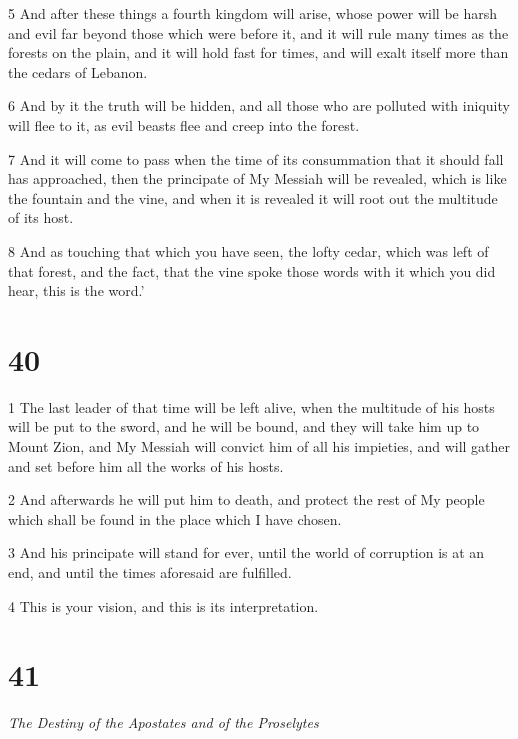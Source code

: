\par 5 And after these things a fourth kingdom will arise, whose power will be harsh and evil far beyond those which were before it, and it will rule many times as the forests on the plain, and it will hold fast for times, and will exalt itself more than the cedars of Lebanon. 

\par 6 And by it the truth will be hidden, and all those who are polluted with iniquity will flee to it, as evil beasts flee and creep into the forest. 

\par 7 And it will come to pass when the time of its consummation that it should fall has approached, then the principate of My Messiah will be revealed, which is like the fountain and the vine, and when it is revealed it will root out the multitude of its host. 

\par 8 And as touching that which you have seen, the lofty cedar, which was left of that forest, and the fact, that the vine spoke those words with it which you did hear, this is the word.’

\chapter{40}

\par 1 The last leader of that time will be left alive, when the multitude of his hosts will be put to the sword, and he will be bound, and they will take him up to Mount Zion, and My Messiah will convict him of all his impieties, and will gather and set before him all the works of his hosts. 

\par 2 And afterwards he will put him to death, and protect the rest of My people which shall be found in the place which I have chosen. 

\par 3 And his principate will stand for ever, until the world of corruption is at an end, and until the times aforesaid are fulfilled. 

\par 4 This is your vision, and this is its interpretation.


\chapter{41}

\par \textit{The Destiny of the Apostates and of the Proselytes}

